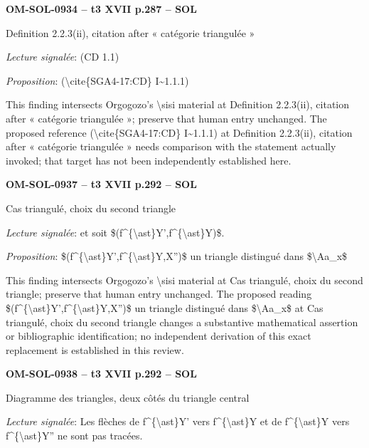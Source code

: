 \par\noindent\textbf{OM-SOL-0934 -- t3 XVII p.287 -- SOL}\par
Definition 2.2.3(ii), citation after « catégorie triangulée »\par
\emph{Lecture signalée}: (CD 1.1)\par
\emph{Proposition}: (\textbackslash{}cite\{SGA4-17:CD\} I\textasciitilde{}1.1.1)\par
This finding intersects Orgogozo's \textbackslash{}sisi material at Definition 2.2.3(ii), citation after « catégorie triangulée »; preserve that human entry unchanged. The proposed reference (\textbackslash{}cite\{SGA4-17:CD\} I\textasciitilde{}1.1.1) at Definition 2.2.3(ii), citation after « catégorie triangulée » needs comparison with the statement actually invoked; that target has not been independently established here.\par
\par\noindent\textbf{OM-SOL-0937 -- t3 XVII p.292 -- SOL}\par
Cas triangulé, choix du second triangle\par
\emph{Lecture signalée}: et soit \$(f\textasciicircum{}\{\textbackslash{}ast\}Y',f\textasciicircum{}\{\textbackslash{}ast\}Y)\$.\par
\emph{Proposition}: \$(f\textasciicircum{}\{\textbackslash{}ast\}Y',f\textasciicircum{}\{\textbackslash{}ast\}Y,X'')\$ un triangle distingué dans \$\textbackslash{}Aa\_x\$\par
This finding intersects Orgogozo's \textbackslash{}sisi material at Cas triangulé, choix du second triangle; preserve that human entry unchanged. The proposed reading \$(f\textasciicircum{}\{\textbackslash{}ast\}Y',f\textasciicircum{}\{\textbackslash{}ast\}Y,X'')\$ un triangle distingué dans \$\textbackslash{}Aa\_x\$ at Cas triangulé, choix du second triangle changes a substantive mathematical assertion or bibliographic identification; no independent derivation of this exact replacement is established in this review.\par
\par\noindent\textbf{OM-SOL-0938 -- t3 XVII p.292 -- SOL}\par
Diagramme des triangles, deux côtés du triangle central\par
\emph{Lecture signalée}: Les flèches de f\textasciicircum{}\{\textbackslash{}ast\}Y' vers f\textasciicircum{}\{\textbackslash{}ast\}Y et de f\textasciicircum{}\{\textbackslash{}ast\}Y vers f\textasciicircum{}\{\textbackslash{}ast\}Y'' ne sont pas tracées.\par
